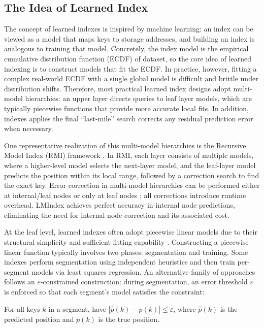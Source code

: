 \subsection{The Idea of Learned Index}
The concept of learned indexes is inspired by machine learning: an index can be viewed as a model that maps keys to storage addresses, and building an index is analogous to training that model\cite{case18}. Concretely, the index model is the empirical cumulative distribution function (ECDF) of dataset, so the core idea of learned indexing is to construct models that fit the ECDF. In practice, however, fitting a complex real-world ECDF with a single global model is difficult and brittle under distribution shifts. Therefore, most practical learned index designs adopt multi-model hierarchies: an upper layer directs queries to leaf layer models, which are typically piecewise functions that provide more accurate local fits. In addition, indexes applies the final “last-mile” search corrects any residual prediction error when necessary.

One representative realization of this multi-model hierarchies is the Recursive Model Index (RMI) framework \cite{case18}. In RMI, each layer consists of multiple models, where a higher-level model selects the next-layer model, and the leaf-layer model predicts the position within its local range, followed by a correction search to find the exact key. Error correction in multi-model hierarchies can be performed either at internal/leaf nodes \cite{pgm20, xindex20, finedex21} or only at leaf nodes \cite{case18, alex20}; all corrections introduce runtime overhead. LMIndex achieves perfect accuracy in internal node predictions, eliminating the need for internal node correction and its associated cost.

At the leaf level, learned indexes often adopt piecewise linear models due to their structural simplicity and sufficient fitting capability \cite{sosd20}. Constructing a piecewise linear function typically involves two phases: segmentation and training. Some indexes \cite{alex20, swix24, carmi22} perform segmentation using independent heuristics and then train per-segment models via least squares regression. An alternative family of approaches \cite{fiting-tree19, pgm20, bourbon20} follows an $\varepsilon$-constrained construction: during segmentation, an error threshold $\varepsilon$ is enforced so that each segment’s model satisfies the constraint:

\begin{constraint}
\label{cons:epsi}
    For all keys $k$ in a segment, have $|\hat{p}(k) - p(k)| \le \varepsilon$, where $\hat{p}(k)$ is the predicted position and $p(k)$ is the true position.
\end{constraint}


